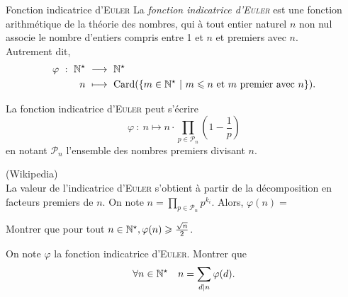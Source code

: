 \begin{defi}{Fonction indicatrice d'\textsc{Euler}}
    La \emph{fonction indicatrice d'\textsc{Euler}} est une fonction arithmétique de la théorie des nombres, qui à tout entier naturel $n$ non nul associe le nombre d'entiers compris entre 1 et $n$ et premiers avec $n$. \\
    Autrement dit, 
    \begin{alignat*}{2}
        \varphi\ :\ \mathbb{N}^\star\ &\longrightarrow\ \mathbb{N}^\star\\
        n\ &\longmapsto\ \mathrm{Card}(\{m \in \mathbb{N}^\star\ |\ m \leqslant n \text{ et } m \text{ premier avec } n \}).
    \end{alignat*}
\end{defi}


\begin{prop}{}
    La fonction indicatrice d'\textsc{Euler} peut s'écrire
    $$\varphi\ :\ n \longmapsto n \cdot \prod_{p \in \mathscr{P}_n} \left(1 - \frac{1}{p} \right)$$
    en notant $\mathscr{P}_n$ l'ensemble des nombres premiers divisant $n$.
\end{prop}

\begin{preuve}
    (Wikipedia) \\
    La valeur de l'indicatrice d'\textsc{Euler} s'obtient à partir de la décomposition en facteurs premiers de $n$. On note $n = \prod\limits_{p \in \mathscr{P}_n} p^{k_i}$. Alors, $\varphi(n) = $
\end{preuve}

\begin{exercice}
    Montrer que pour tout $n \in \mathbb{N}^\star, \varphi(n) \geqslant \frac{\sqrt{n}}{2}$.
\end{exercice}

\begin{exercice}
    On note $\varphi$ la fonction indicatrice d'\textsc{Euler}. Montrer que 
    $$\forall n \in \mathbb{N}^\star \quad n = \sum_{d|n} \varphi(d).$$
\end{exercice}

